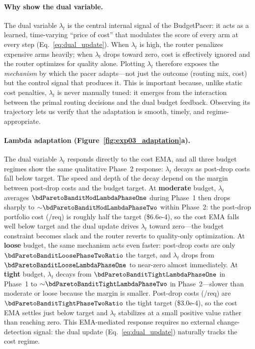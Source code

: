 \paragraph{Why show the dual variable.}
The dual variable $\lambda_t$ is the central internal signal of the
BudgetPacer: it acts as a learned, time-varying ``price of cost''
that modulates the score of every arm at every step
(Eq.~\ref{eq:dual_update}).
When $\lambda_t$ is high, the router penalizes expensive arms
heavily; when $\lambda_t$ drops toward zero, cost is effectively
ignored and the router optimizes for quality alone.
Plotting $\lambda_t$ therefore exposes the \emph{mechanism} by
which the pacer adapts---not just the outcome (routing mix, cost)
but the control signal that produces it.
This is important because, unlike static cost penalties, $\lambda_t$
is never manually tuned: it emerges from the interaction between
the primal routing decisions and the dual budget feedback.
Observing its trajectory lets us verify that the adaptation is
smooth, timely, and regime-appropriate.

\paragraph{Lambda adaptation (Figure~\ref{fig:exp03_adaptation}a).}
The dual variable $\lambda_t$ responds directly to the cost EMA,
and all three budget regimes show the same qualitative Phase~2
response: $\lambda_t$ decays as post-drop costs fall below target.
The speed and depth of the decay depend on the margin between
post-drop costs and the budget target.
At \textbf{moderate} budget, $\lambda_t$ averages
$\bdParetoBanditModLambdaPhaseOne$ during Phase~1 then drops sharply
to ${\sim}\bdParetoBanditModLambdaPhaseTwo$ within Phase~2:
the post-drop portfolio cost (\bdParetoBanditModPhaseTwoCost/req)
is roughly half the target (\$6.6e-4), so the cost EMA falls well
below target and the dual update drives $\lambda_t$ toward
zero---the budget constraint becomes slack and the router reverts
to quality-only optimization.
At \textbf{loose} budget, the same mechanism acts even faster:
post-drop costs are only $\bdParetoBanditLoosePhaseTwoRatio$ the
target, and $\lambda_t$ drops from
$\bdParetoBanditLooseLambdaPhaseOne$ to near-zero almost
immediately.
At \textbf{tight} budget, $\lambda_t$ decays from
$\bdParetoBanditTightLambdaPhaseOne$ in Phase~1 to
${\sim}\bdParetoBanditTightLambdaPhaseTwo$ in Phase~2---slower
than moderate or loose because the margin is smaller.  Post-drop
costs (\bdParetoBanditTightPhaseTwoCost/req) are
$\bdParetoBanditTightPhaseTwoRatio$ the tight target (\$3.0e-4),
so the cost EMA settles just below target and $\lambda_t$
stabilizes at a small positive value rather than reaching zero.
This EMA-mediated response requires no external change-detection
signal: the dual update (Eq.~\ref{eq:dual_update}) naturally tracks
the cost regime.


